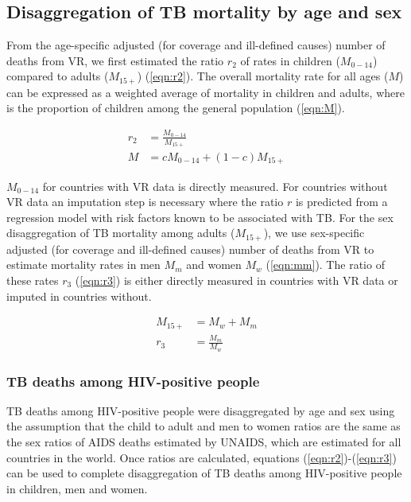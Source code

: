 \subsection{Disaggregation of TB mortality by age and sex}


From the age-specific adjusted (for coverage and ill-defined causes) number of deaths from VR, we first estimated the ratio $r_2$ of rates in children ($M_{0-14}$) compared to adults ($M_{15+}$) (\ref{eqn:r2}). The overall mortality rate for all ages ($M$) can be expressed as a weighted average of mortality in children and adults, where  is the proportion of children among the general population (\ref{eqn:M}).

\begin{equation}
\begin{align}
r_2 &= \frac{M_{0-14}}{M_{15+}} \label{eqn:r2} \\
M &= c M_{0-14} + (1 - c) M_{15+} \label{eqn:M}
\end{align}
\end{equation}

$M_{0-14}$ for countries with VR data is directly measured. For countries without VR data an imputation step is necessary where the ratio $r$ is predicted from a regression model with risk factors known to be associated with TB. For the sex disaggregation of TB mortality among adults ($M_{15+}$), we use sex-specific adjusted (for coverage and ill-defined causes) number of deaths from VR to estimate mortality rates in men $M_m$  and women $M_w$ (\ref{eqn:mm}). The ratio of these rates $r_3$ (\ref{eqn:r3}) is either directly measured in countries with VR data or imputed in countries without.

\begin{equation}
\begin{align}
M_{15+} &= M_w + M_m \label{eqn:mm} \\
r_3 &= \frac{M_m}{M_w} \label{eqn:r3}
\end{align}
\end{equation}


\subsubsection{TB deaths among HIV-positive people}

TB deaths among HIV-positive people were disaggregated by age and sex using the assumption that the child to adult and men to women ratios are the same as the sex ratios of AIDS deaths estimated by UNAIDS, which are estimated for all countries in the world. Once ratios are calculated, equations (\ref{eqn:r2})-(\ref{eqn:r3}) can be used to complete disaggregation of TB deaths among HIV-positive people in children, men and women.
